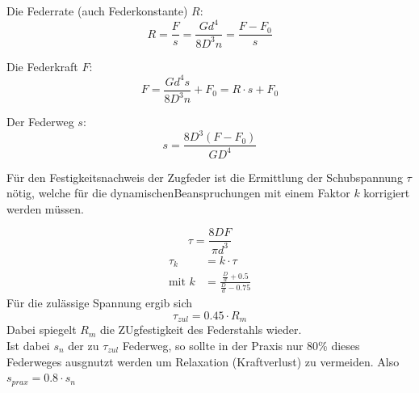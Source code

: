 Die Federrate (auch Federkonstante) $R$:
\begin{equation}
    R=\frac{F}{s}=\frac{Gd^4}{8D^3n}=\frac{F-F_0}{s}
    \label{eqn:federrate}
\end{equation}

Die Federkraft $F$:
\begin{equation}
    F=\frac{Gd^4s}{8D^3n}+F_0=R \cdot s +F_0
    \label{eqn:federkraft}
\end{equation}

Der Federweg $s$:
\begin{equation}
    s=\frac{8D^3(F-F_0)}{GD^4}
    \label{eqn:federweg}
\end{equation}

Für den Festigkeitsnachweis der Zugfeder ist die Ermittlung der Schubspannung $\tau$
nötig, welche für die dynamischenBeanspruchungen mit einem Faktor $k$ korrigiert werden müssen.

\begin{equation}
    \tau = \frac{8DF}{\pi d^3}
    \label{eqn:schubspannung}
\end{equation}
\begin{align}
    \tau_k &= k \cdot \tau\\
    \text{mit }k&=\frac{\frac{D}{d}+0.5}{\frac{D}{d}-0.75}
\end{align}
Für die zulässige Spannung ergib sich
\begin{equation}
    \tau_{zul}=0.45 \cdot R_m
\end{equation}
Dabei spiegelt $R_m$ die ZUgfestigkeit des Federstahls wieder.\\
Ist dabei $s_n$ der zu $\tau_{zul}$ Federweg, so sollte in der Praxis nur 80\% dieses
Federweges ausgnutzt werden um Relaxation (Kraftverlust) zu vermeiden.
Also $s_{prax}=0.8 \cdot s_n$  




\label{sec:theorie}